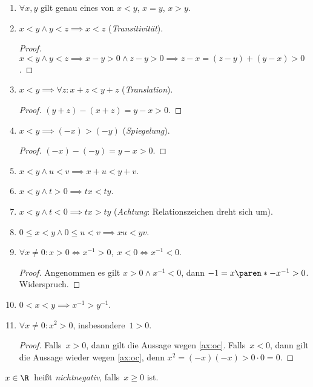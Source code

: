 \documentclass[a4paper]{article}
\begin{document}
\begin{enumerate}[resume*=conclusions]
    \item $\forall x, y$ gilt genau eines von $x < y$, $x = y$, $x > y$.
    \item $x < y \wedge y < z \implies x < z$ (\emph{Transitivität}).
          \begin{proof}
              $x < y \wedge y < z \implies x - y > 0 \wedge z - y > 0 \implies z - x = (z - y) + (y - x) > 0$.
          \end{proof}
    \item $x < y \implies \forall z\colon x + z < y + z$ (\emph{Translation}).
          \begin{proof}
              $(y + z) - (x + z) = y - x > 0$.
          \end{proof}
    \item $x < y \implies (-x) > (-y)$ (\emph{Spiegelung}).
          \begin{proof}
              $(-x) - (-y) = y - x > 0$.
          \end{proof}
    \item $x < y \wedge u < v \implies x + u < y + v$.
    \item $x < y \wedge t > 0 \implies tx < ty$.
    \item $x < y \wedge t < 0 \implies tx > ty$ (\emph{Achtung}: Relationszeichen dreht sich um).
    \item $0 \leq x < y \wedge 0 \leq u < v \implies xu < yv$.
    \item $\forall x \neq 0\colon x > 0 \iff x^{-1} > 0, \;x < 0 \iff x^{-1} < 0$.
          \begin{proof}
              Angenommen es gilt $x > 0 \wedge x^{-1} < 0$, dann $-1 = x \paren*{-x^{-1}} > 0$. Widerspruch.
          \end{proof}
    \item $0 < x < y \implies x^{-1} > y^{-1}$.
    \item $\forall x \neq 0\colon x^2 > 0$, insbesondere~$1 > 0$.
          \begin{proof}
              Falls~$x > 0$, dann gilt die Aussage wegen \cref{ax:oc}. Falls~$x < 0$, dann gilt die Aussage wieder wegen \cref{ax:oc}, denn $x^2 = (-x) (-x) > 0 \cdot 0 = 0$.
          \end{proof}
\end{enumerate}

\begin{notation}[nichtnegativ]
    $x \in \R$~heißt \emph{nichtnegativ}, falls~$x \geq 0$ ist.
\end{notation}
\end{document}
